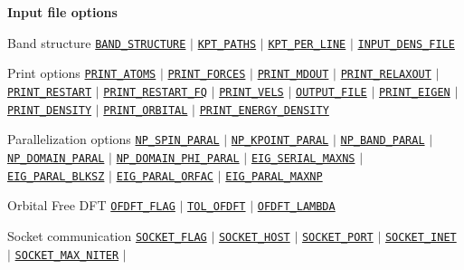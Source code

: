 \begin{frame}[allowframebreaks]{\textbf{Input file options}}
  \vspace{-2mm}
  \begin{block}{Band structure}
  \hyperlink{BAND_STRUCTURE}{\texttt{BAND\_STRUCTURE}} $\vert$
  \hyperlink{KPT_PATHS}{\texttt{KPT\_PATHS}} $\vert$
  \hyperlink{KPT_PER_LINE}{\texttt{KPT\_PER\_LINE}} $\vert$
  \hyperlink{INPUT_DENS_FILE}{\texttt{INPUT\_DENS\_FILE}}
  \end{block}
  
  \begin{block}{Print options}
  \hyperlink{PRINT_ATOMS}{\texttt{PRINT\_ATOMS}} $\vert$
  \hyperlink{PRINT_FORCES}{\texttt{PRINT\_FORCES}} $\vert$
  \hyperlink{PRINT_MDOUT}{\texttt{PRINT\_MDOUT}} $\vert$
  \hyperlink{PRINT_RELAXOUT}{\texttt{PRINT\_RELAXOUT}} $\vert$
  \hyperlink{PRINT_RESTART}{\texttt{PRINT\_RESTART}} $\vert$
  \hyperlink{PRINT_RESTART_FQ}{\texttt{PRINT\_RESTART\_FQ}} $\vert$
  \hyperlink{PRINT_VELS}{\texttt{PRINT\_VELS}} $\vert$
  \hyperlink{OUTPUT_FILE}{\texttt{OUTPUT\_FILE}} $\vert$
  \hyperlink{PRINT_EIGEN}{\texttt{PRINT\_EIGEN}} $\vert$
  \hyperlink{PRINT_DENSITY}{\texttt{PRINT\_DENSITY}} $\vert$
  \hyperlink{PRINT_ORBITAL}{\texttt{PRINT\_ORBITAL}} $\vert$
  \hyperlink{PRINT_ENERGY_DENSITY}{\texttt{PRINT\_ENERGY\_DENSITY}}
  \end{block}
  
  \begin{block}{Parallelization options}
  \hyperlink{NP_SPIN_PARAL}{\texttt{NP\_SPIN\_PARAL}} $\vert$
  \hyperlink{NP_KPOINT_PARAL}{\texttt{NP\_KPOINT\_PARAL}} $\vert$
  \hyperlink{NP_BAND_PARAL}{\texttt{NP\_BAND\_PARAL}} $\vert$
  \hyperlink{NP_DOMAIN_PARAL}{\texttt{NP\_DOMAIN\_PARAL}} $\vert$
  \hyperlink{NP_DOMAIN_PHI_PARAL}{\texttt{NP\_DOMAIN\_PHI\_PARAL}} $\vert$
  \hyperlink{EIG_SERIAL_MAXNS}{\texttt{EIG\_SERIAL\_MAXNS}} $\vert$
  \hyperlink{EIG_PARAL_BLKSZ}{\texttt{EIG\_PARAL\_BLKSZ}} $\vert$
  \hyperlink{EIG_PARAL_ORFAC}{\texttt{EIG\_PARAL\_ORFAC}} $\vert$
  \hyperlink{EIG_PARAL_MAXNP}{\texttt{EIG\_PARAL\_MAXNP}}
  \end{block}

  \begin{block}{Orbital Free DFT}
  \hyperlink{OFDFT_FLAG}{\texttt{OFDFT\_FLAG}} $\vert$ \hyperlink{TOL_OFDFT}{\texttt{TOL\_OFDFT}} $\vert$ \hyperlink{OFDFT_LAMBDA}{\texttt{OFDFT\_LAMBDA}}
  \end{block}

  \begin{block}{Socket communication}
  \hyperlink{SOCKET_FLAG}{\texttt{SOCKET\_FLAG}} $\vert$
  \hyperlink{SOCKET_HOST}{\texttt{SOCKET\_HOST}} $\vert$
  \hyperlink{SOCKET_PORT}{\texttt{SOCKET\_PORT}} $\vert$
  \hyperlink{SOCKET_INET}{\texttt{SOCKET\_INET}} $\vert$
  \hyperlink{SOCKET_MAX_NITER}{\texttt{SOCKET\_MAX\_NITER}} $\vert$
  \end{block}
  
  \end{frame}
  
